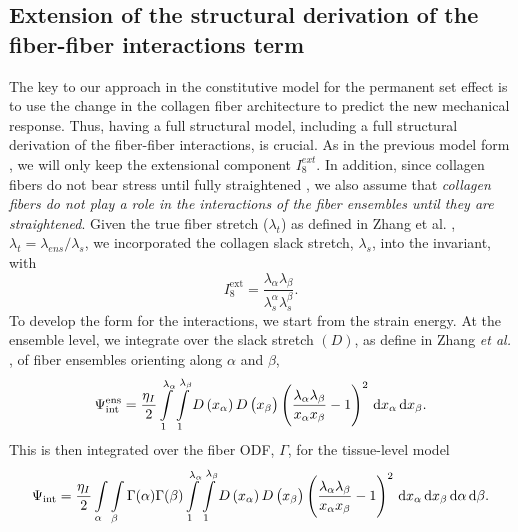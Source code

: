 \subsection{Extension of the structural derivation of the fiber-fiber interactions term}

The key to our approach in the constitutive model for the permanent set effect is to use the change in the collagen fiber architecture to predict the new mechanical response. 
Thus, having a full structural model, including a full structural derivation of the fiber-fiber interactions, is crucial. 
As in the previous model form \cite{sacks_novel_2016}, we will only keep the extensional component $I_8^{ext}$. In addition, since collagen fibers do not bear stress until fully straightened \cite{soares_biomechanical_2016}, we also assume that \emph{collagen fibers do not play a role in the interactions of the fiber ensembles until they are straightened}. Given the true fiber stretch ($\lambda_t$) as defined in Zhang et al. \cite{zhang_meso_2016}, $\lambda_t = \lambda_{ens}/\lambda_s$, we incorporated the collagen slack stretch, $\lambda_s$, into the invariant, with
\begin{equation}
I_8^{\mathrm{ext}} = \frac{\lambda_\alpha \lambda_\beta}{\lambda^\alpha_s \lambda_s^\beta}.
\end{equation}
To develop the form for the interactions, we start from the strain energy. 
At the ensemble level, we integrate over the slack stretch $(D)$, as define in Zhang \textit{et al.} \cite{zhang_meso_2016}, of fiber ensembles orienting along $\alpha$ and $\beta$, 
\begin{equation}
\Psi_{\mathrm{int}}^{\mathrm{ens}} = \frac{\eta_I}{2} \int\displaylimits_1^{\lambda_\alpha} \int\displaylimits_1^{\lambda_\beta} D\left( x_\alpha \right) D\left( x_\beta \right) \left( \frac{\lambda_\alpha \lambda_\beta}{x_\alpha x_\beta} - 1\right)^2 \,\mathrm{d}x_\alpha \,\mathrm{d}x_\beta.
\end{equation}
This is then integrated over the fiber ODF, $\Gamma$, for the tissue-level model
\begin{equation}
\Psi_{\mathrm{int}} = \frac{\eta_I}{2} \int\displaylimits_\alpha \int\displaylimits_\beta \Gamma(\alpha) \Gamma(\beta) \int\displaylimits_1^{\lambda_\alpha} \int\displaylimits_1^{\lambda_\beta} D\left( x_\alpha \right) D\left( x_\beta \right) \left( \frac{\lambda_\alpha \lambda_\beta}{x_\alpha x_\beta} - 1\right)^2 \,\mathrm{d}x_\alpha \,\mathrm{d}x_\beta \,\mathrm{d}\alpha \,\mathrm{d}\beta.
\end{equation}
